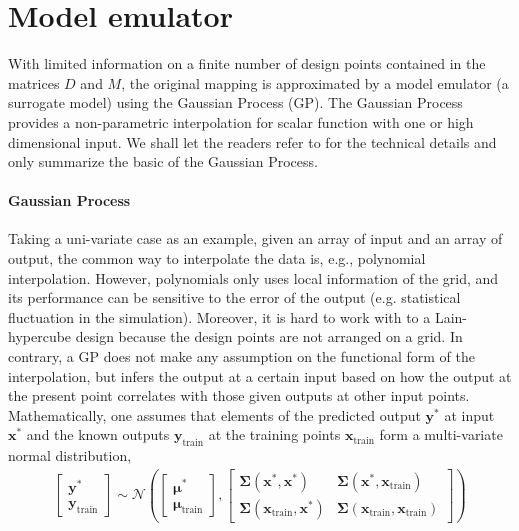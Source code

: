 \section{Model emulator}
With limited information on a finite number of design points contained in the matrices $D$ and $M$, the original mapping is approximated by a model emulator (a surrogate model) using the Gaussian Process (GP).
The Gaussian Process provides a non-parametric interpolation for scalar function with one or high dimensional input.
We shall let the readers refer to \cite{Rasmussen:2006gp} for the technical details and only summarize the basic of the Gaussian Process.

\paragraph{Gaussian Process} Taking a uni-variate case as an example, given an array of input and an array of output, the common way to interpolate the data is, e.g., polynomial interpolation.
However, polynomials only uses local information of the grid, and its performance can be sensitive to the error of the output (e.g. statistical fluctuation in the simulation).
Moreover, it is hard to work with to a Lain-hypercube design because the design points are not arranged on a grid.
In contrary, a GP does not make any assumption on the functional form of the interpolation, but infers the output at a certain input based on how the output at the present point correlates with those given outputs at other input points.
Mathematically, one assumes that elements of the predicted output $\mathbf{y}^*$ at input $\mathbf{x^*}$ and the known outputs $\mathbf{y}_{\textrm{train}}$ at the training points $\mathbf{x}_{\textrm{train}}$ form a multi-variate normal distribution,
\begin{eqnarray}
\begin{bmatrix}
\mathbf{y}^* \\
\mathbf{y}_{\textrm{train}}
\end{bmatrix}
\sim
\mathcal{N}\left(
\begin{bmatrix}
\mathbf{\mu}^* \\
\mathbf{\mu}_{\textrm{train}}
\end{bmatrix},
\begin{bmatrix}
\mathbf{\Sigma}(\mathbf{x}^*, \mathbf{x}^*)& \mathbf{\Sigma}(\mathbf{x}^*, \mathbf{x}_{\textrm{train}}) \\
\mathbf{\Sigma}(\mathbf{x}_{\textrm{train}}, \mathbf{x}^*)& \mathbf{\Sigma}(\mathbf{x}_{\textrm{train}}, \mathbf{x}_{\textrm{train}})
\end{bmatrix}
\right)
\end{eqnarray}
